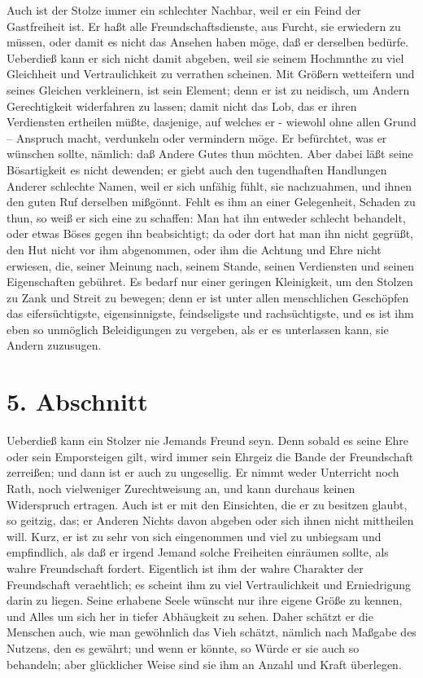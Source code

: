 Auch ist der Stolze immer ein schlechter Nachbar, weil er ein Feind der
Gastfreiheit ist. Er haßt alle Freundschaftsdienste, aus Furcht, sie erwiedern
zu müssen, oder damit es nicht das Ansehen haben möge, daß er derselben bedürfe.
Ueberdieß kann er sich nicht damit abgeben, weil sie seinem Hochmnthe zu viel
Gleichheit und Vertraulichkeit zu verrathen scheinen. Mit Größern wetteifern und
seines Gleichen verkleinern, ist sein Element; denn er ist zu neidisch, um
Andern Gerechtigkeit widerfahren zu lassen; damit nicht das Lob, das er ihren
Verdiensten ertheilen müßte, dasjenige, auf welches er - wiewohl ohne allen
Grund -- Anspruch macht, verdunkeln oder vermindern möge. Er befürchtet, was er
wünschen sollte, nämlich: daß Andere Gutes thun möchten. Aber dabei läßt seine
Bösartigkeit es nicht dewenden; er giebt auch den tugendhaften Handlungen
Anderer schlechte Namen, weil er sich unfähig fühlt, sie nachzuahmen, und ihnen
den guten Ruf derselben mißgönnt. Fehlt es ihm an einer Gelegenheit, Schaden zu
thun, so weiß er sich eine zu schaffen: Man hat ihn entweder schlecht behandelt,
oder etwas Böses gegen ihn beabsichtigt; da oder dort hat man ihn nicht gegrüßt,
den Hut nicht vor ihm abgenommen, oder ihm die Achtung und Ehre nicht erwiesen,
die, seiner Meinung nach, seinem Stande, seinen Verdiensten und seinen
Eigenschaften gebühret. Es bedarf nur einer geringen Kleinigkeit, um den Stolzen
zu Zank und Streit zu bewegen; denn er ist unter allen menschlichen Geschöpfen
das eifersüchtigste, eigensinnigste, feindseligste und rachsüchtigste, und es
ist ihm eben so unmöglich Beleidigungen zu vergeben, als er es unterlassen kann,
sie Andern zuzusugen.

\section{5. Abschnitt} \label{kap12_ab5}

Ueberdieß kann ein Stolzer nie Jemands Freund seyn. Denn sobald es seine Ehre
oder sein Emporsteigen gilt, wird immer sein Ehrgeiz die Bande der Freundschaft
zerreißen; und dann ist er auch zu ungesellig. Er nimmt weder Unterricht noch
Rath, noch vielweniger Zurechtweisung an, und kann durchaus keinen Widerspruch
ertragen. Auch ist er mit den Einsichten, die er zu besitzen glaubt, so geitzig,
das; er Anderen Nichts davon abgeben oder sich ihnen nicht mittheilen will.
Kurz, er ist zu sehr von sich eingenommen und viel zu unbiegsam und empfindlich,
als daß er irgend Jemand solche Freiheiten einräumen sollte, als wahre
Freundschaft fordert. Eigentlich ist ihm der wahre Charakter der Freundschaft
veraehtlich; es scheint ihm zu viel Vertraulichkeit und Erniedrigung darin zu
liegen. Seine erhabene Seele wünscht nur ihre eigene Größe zu kennen, und Alles
um sich her in tiefer Abhäugkeit zu sehen. Daher schätzt er die Menschen auch,
wie man gewöhnlich das Vieh schätzt, nämlich nach Maßgabe des Nutzens, den es
gewährt; und wenn er könnte, so Würde er sie auch so behandeln; aber glücklicher
Weise sind sie ihm an Anzahl und Kraft überlegen.

